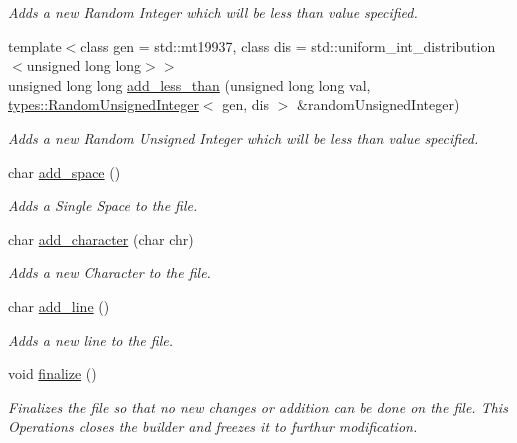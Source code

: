 \begin{DoxyCompactItemize}
\begin{DoxyCompactList}\small\item\em Adds a new Random Integer which will be less than value specified. \end{DoxyCompactList}\item 
{\footnotesize template$<$class gen  = std\+::mt19937, class dis  = std\+::uniform\+\_\+int\+\_\+distribution$<$unsigned long long$>$$>$ }\\unsigned long long \mbox{\hyperlink{classtestcaser_1_1maker_1_1TestCaseBuilder_abc8a125ff2b991fc530a8263ba10ff3f}{add\+\_\+less\+\_\+than}} (unsigned long long val, \mbox{\hyperlink{classtestcaser_1_1maker_1_1types_1_1RandomUnsignedInteger}{types\+::\+Random\+Unsigned\+Integer}}$<$ gen, dis $>$ \&random\+Unsigned\+Integer)
\begin{DoxyCompactList}\small\item\em Adds a new Random Unsigned Integer which will be less than value specified. \end{DoxyCompactList}\item 
char \mbox{\hyperlink{classtestcaser_1_1maker_1_1TestCaseBuilder_a5c23f3b3d3533c48477741da8337af98}{add\+\_\+space}} ()
\begin{DoxyCompactList}\small\item\em Adds a Single Space to the file. \end{DoxyCompactList}\item 
char \mbox{\hyperlink{classtestcaser_1_1maker_1_1TestCaseBuilder_a41885a504a99f9c450e793e183898488}{add\+\_\+character}} (char chr)
\begin{DoxyCompactList}\small\item\em Adds a new Character to the file. \end{DoxyCompactList}\item 
char \mbox{\hyperlink{classtestcaser_1_1maker_1_1TestCaseBuilder_abdb7ac9e7f1036c4b84adf48bb019cfa}{add\+\_\+line}} ()
\begin{DoxyCompactList}\small\item\em Adds a new line to the file. \end{DoxyCompactList}\item 
\mbox{\label{classtestcaser_1_1maker_1_1TestCaseBuilder_a235c9c4e34fe708831cf300f812fbaed}} 
void \mbox{\hyperlink{classtestcaser_1_1maker_1_1TestCaseBuilder_a235c9c4e34fe708831cf300f812fbaed}{finalize}} ()
\begin{DoxyCompactList}\small\item\em Finalizes the file so that no new changes or addition can be done on the file. This Operations closes the builder and freezes it to furthur modification. \end{DoxyCompactList}\item 

\end{DoxyCompactItemize}
